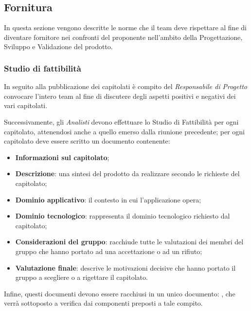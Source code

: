 \subsection{Fornitura}
In questa sezione vengono descritte le norme che il team deve rispettare al fine di diventare fornitore nei confronti del proponente nell'ambito della Progettazione, Sviluppo e Validazione del prodotto.
\subsubsection{Studio di fattibilità}
In seguito alla pubblicazione dei capitolati è compito del \textit{Responsabile di Progetto} convocare l'intero team al fine di discutere degli aspetti positivi e negativi dei vari capitolati.

Successivamente, gli \textit{Analisti} devono effettuare lo Studio di Fattibilità per ogni capitolato, attenendosi anche a quello emerso dalla riunione precedente; per ogni capitolato deve essere scritto un documento contenente:
\begin{itemize}
\item \textbf{Informazioni sul capitolato};
\item \textbf{Descrizione}: una sintesi del prodotto da realizzare secondo le richieste del capitolato;
\item \textbf{Dominio applicativo}: il contesto in cui l'applicazione opera;
\item \textbf{Dominio tecnologico}: rappresenta il dominio tecnologico richiesto dal capitolato;
\item \textbf{Considerazioni del gruppo}: racchiude tutte le valutazioni dei membri del gruppo che hanno portato ad una accettazione o ad un rifiuto;
\item \textbf{Valutazione finale}: descrive le motivazioni decisive che hanno portato il gruppo a scegliere o a rigettare il capitolato.
\end{itemize}
Infine, questi documenti devono essere racchiusi in un unico documento: \SdF , che verrà sottoposto a verifica dai componenti preposti a tale compito.

